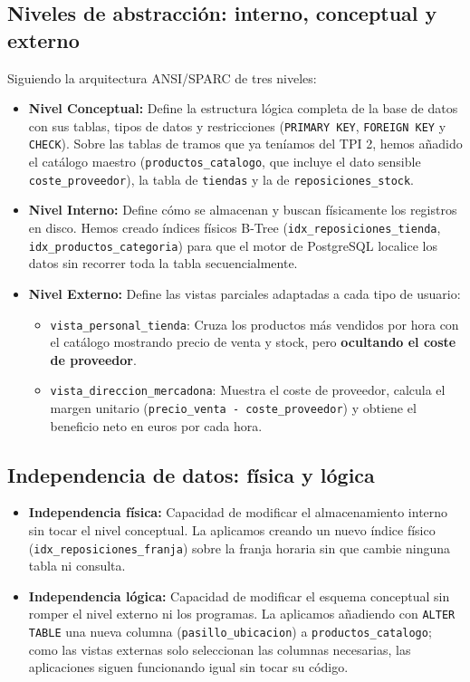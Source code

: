 \documentclass[a4paper,12pt]{article}
\begin{document}
\subsection{Niveles de abstracción: interno, conceptual y externo}
Siguiendo la arquitectura ANSI/SPARC de tres niveles:
\begin{itemize}[leftmargin=1.0cm]
    \item \textbf{Nivel Conceptual:} Define la estructura lógica completa de la base de datos con sus tablas, tipos de datos y restricciones (\texttt{PRIMARY KEY}, \texttt{FOREIGN KEY} y \texttt{CHECK}). Sobre las tablas de tramos que ya teníamos del TPI 2, hemos añadido el catálogo maestro (\texttt{productos\_catalogo}, que incluye el dato sensible \texttt{coste\_proveedor}), la tabla de \texttt{tiendas} y la de \texttt{reposiciones\_stock}.
    \item \textbf{Nivel Interno:} Define cómo se almacenan y buscan físicamente los registros en disco. Hemos creado índices físicos B-Tree (\texttt{idx\_reposiciones\_tienda}, \texttt{idx\_productos\_categoria}) para que el motor de PostgreSQL localice los datos sin recorrer toda la tabla secuencialmente.
    \item \textbf{Nivel Externo:} Define las vistas parciales adaptadas a cada tipo de usuario:
    \begin{itemize}
        \item \texttt{vista\_personal\_tienda}: Cruza los productos más vendidos por hora con el catálogo mostrando precio de venta y stock, pero \textbf{ocultando el coste de proveedor}.
        \item \texttt{vista\_direccion\_mercadona}: Muestra el coste de proveedor, calcula el margen unitario (\texttt{precio\_venta - coste\_proveedor}) y obtiene el beneficio neto en euros por cada hora.
    \end{itemize}
\end{itemize}

\subsection{Independencia de datos: física y lógica}
\begin{itemize}[leftmargin=1.0cm]
    \item \textbf{Independencia física:} Capacidad de modificar el almacenamiento interno sin tocar el nivel conceptual. La aplicamos creando un nuevo índice físico (\texttt{idx\_reposiciones\_franja}) sobre la franja horaria sin que cambie ninguna tabla ni consulta.
    \item \textbf{Independencia lógica:} Capacidad de modificar el esquema conceptual sin romper el nivel externo ni los programas. La aplicamos añadiendo con \texttt{ALTER TABLE} una nueva columna (\texttt{pasillo\_ubicacion}) a \texttt{productos\_catalogo}; como las vistas externas solo seleccionan las columnas necesarias, las aplicaciones siguen funcionando igual sin tocar su código.
\end{itemize}
\end{document}
